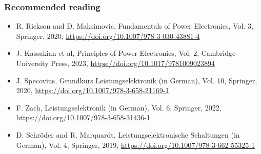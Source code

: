 \begin{frame}
	\frametitle{Recommended reading}
	\begin{itemize}
		\item R. Rickson and D. Maksimovic, Fundamentals of Power Electronics, Vol. 3, Springer, 2020, \url{https://doi.org/10.1007/978-3-030-43881-4}
		\item J. Kassakian et al, Principles of Power Electronics, Vol. 2,  Cambridge University Press, 2023, \url{https://doi.org/10.1017/9781009023894}
		\item J. Specovius, Grundkurs Leistungselektronik (in German), Vol. 10, Springer, 2020, \url{https://doi.org/10.1007/978-3-658-21169-1}
		\item F. Zach, Leistungselektronik (in German), Vol. 6, Springer, 2022, \url{https://doi.org/10.1007/978-3-658-31436-1}
		\item D. Schröder and R. Marquardt, Leistungselektronische	Schaltungen (in German), Vol. 4, Springer, 2019, \url{https://doi.org/10.1007/978-3-662-55325-1}
	\end{itemize}
\end{frame}